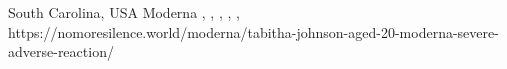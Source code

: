           {
            South Carolina, USA
          }
          {
          }
          {
            Moderna
          }
          {
          }
          {
            ,
            ,
            ,
            ,
            ,
          }
          {
            https://nomoresilence.world/moderna/tabitha-johnson-aged-20-moderna-severe-adverse-reaction/
          }

